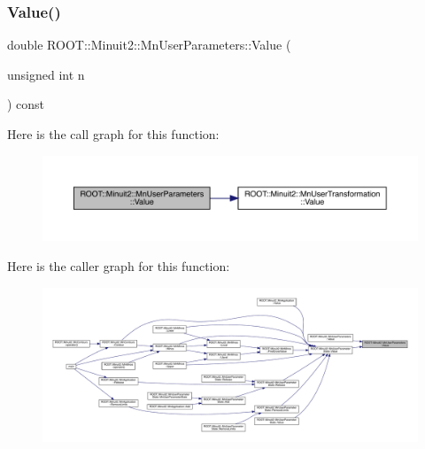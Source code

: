 \mbox{\label{classROOT_1_1Minuit2_1_1MnUserParameters_a5084b0d1312ddb87609ff726a11fd7f6}} 
\subsubsection{\texorpdfstring{Value()}{Value()}\hspace{0.1cm}{\footnotesize\ttfamily [3/6]}}
{\footnotesize\ttfamily double R\+O\+O\+T\+::\+Minuit2\+::\+Mn\+User\+Parameters\+::\+Value (\begin{DoxyParamCaption}\item[{unsigned int}]{n }\end{DoxyParamCaption}) const}

Here is the call graph for this function\+:
\nopagebreak
\begin{figure}[H]
\begin{center}
\leavevmode
\includegraphics[width=350pt]{d6/d10/classROOT_1_1Minuit2_1_1MnUserParameters_a5084b0d1312ddb87609ff726a11fd7f6_cgraph}
\end{center}
\end{figure}
Here is the caller graph for this function\+:
\nopagebreak
\begin{figure}[H]
\begin{center}
\leavevmode
\includegraphics[width=350pt]{d6/d10/classROOT_1_1Minuit2_1_1MnUserParameters_a5084b0d1312ddb87609ff726a11fd7f6_icgraph}
\end{center}
\end{figure}
\mbox{\label{classROOT_1_1Minuit2_1_1MnUserParameters_a4d08de604380552a826ac23ca4978767}} 
